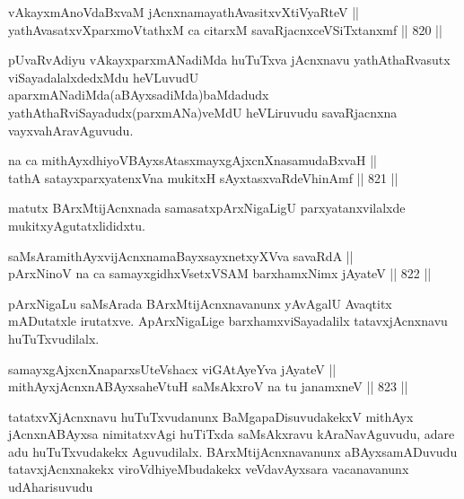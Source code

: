 
\begin{shl}
vAkayxmAnoVdaBxvaM jAcnxnamayathAvasitxvXtiVyaRteV || \\
yathAvasatxvXparxmoVtathxM ca citarxM savaRjacnxceVSiTxtanxmf \hfill || 820 ||  
\end{shl}

\begin{artha}
pUvaRvAdiyu vAkayxparxmANadiMda huTuTxva jAcnxnavu yathAthaRvasutx viSayadalalxdedxMdu heVLuvudU aparxmANadiMda(aBAyxsadiMda)baMdadudx yathAthaRviSayadudx(parxmANa)veMdU heVLiruvudu savaRjacnxna vayxvahAravAguvudu.
\end{artha}


\begin{shl}
na ca mithAyxdhiyoV\s BAyxsAtasxmayxgAjxcnXnasamudaBxvaH || \\
tathA satayxparxyatenxVna mukitxH sAyxtasxvaRdeVhinAmf \hfill || 821 ||  
\end{shl}

\begin{artha}
matutx BArxMtijAcnxnada samasatxpArxNigaLigU parxyatanxvilalxde mukitxyAgutatxlididxtu.
\end{artha}

\begin{shl}
saMsAramithAyxvijAcnxnamaBayxsayxnetxyXVva savaRdA || \\
pArxNinoV na ca samayxgidhxVsetxVSAM barxhamxNimx jAyateV \hfill || 822 ||  
\end{shl}

\begin{artha}
pArxNigaLu saMsArada BArxMtijAcnxnavanunx yAvAgalU Avaqtitx mADutatxle irutatxve. ApArxNigaLige barxhamxviSayadalilx tatavxjAcnxnavu huTuTxvudilalx.
\end{artha}

\begin{shl}
samayxgAjxcnXnaparxsUteVshacx viGAtAyeYva jAyateV || \\
mithAyxjAcnxnABAyxsaheVtuH saMsAkxroV na tu janamxneV \hfill || 823 ||  
\end{shl}

\begin{artha}
tatatxvXjAcnxnavu huTuTxvudanunx BaMgapaDisuvudakekxV mithAyx jAcnxnABAyxsa nimitatxvAgi huTiTxda saMsAkxravu kAraNavAguvudu, adare adu huTuTxvudakekx Aguvudilalx. BArxMtijAcnxnavanunx aBAyxsamADuvudu tatavxjAcnxnakekx viroVdhiyeMbudakekx veVdavAyxsara vacanavanunx udAharisuvudu
\end{artha}

